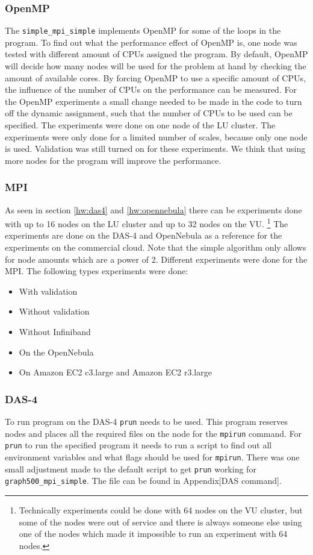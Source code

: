 \subsubsection{OpenMP}
The \texttt{simple\_mpi\_simple} implements OpenMP for some of the loops in the program. To find out what the performance effect of OpenMP is, one node was tested with different amount of CPUs assigned the program. By default, OpenMP will decide how many nodes will be used for the problem at hand by checking the amount of available cores. By forcing OpenMP to use a specific amount of CPUs, the influence of the number of CPUs on the performance can be measured. For the OpenMP experiments a small change needed to be made in the code to turn off the dynamic assignment, such that the number of CPUs to be used can be specified. The experiments were done on one node of the LU cluster. The experiments were only done for a limited number of scales, because only one node is used. Validation was still turned on for these experiments. We think that using more nodes for the program will improve the performance.

\subsubsection{MPI}

As seen in section \ref{hw:das4} and \ref{hw:opennebula} there can be experiments done with up to 16 nodes on the LU cluster and up to 32 nodes on the VU. \footnote{Technically experiments could be done with 64 nodes on the VU cluster, but some of the nodes were out of service and there is always someone else using one of the nodes which made it impossible to run an experiment with 64 nodes.}
The experiments are done on the DAS-4 and OpenNebula as a reference for the experiments on the commercial cloud. 
Note that the simple algorithm only allows for node amounts which are a power of 2. Different experiments were done for the MPI. The following types experiments were done:
\begin{itemize}
	\item With validation
	\item Without validation
	\item Without Infiniband
	\item On the OpenNebula
	\item On Amazon EC2 c3.large and Amazon EC2 r3.large 
\end{itemize}


\subsubsection*{DAS-4}
To run program on the DAS-4 \texttt{prun} needs to be used. This program reserves nodes and places all the required files on the node for the \texttt{mpirun} command. For \texttt{prun} to run the specified program it needs to run a script to find out all environment variables and what flags should be used for \texttt{mpirun}. There was one small adjustment made to the default script to get \texttt{prun} working for \texttt{graph500\_mpi\_simple}. The file can be found in Appendix[DAS command].

